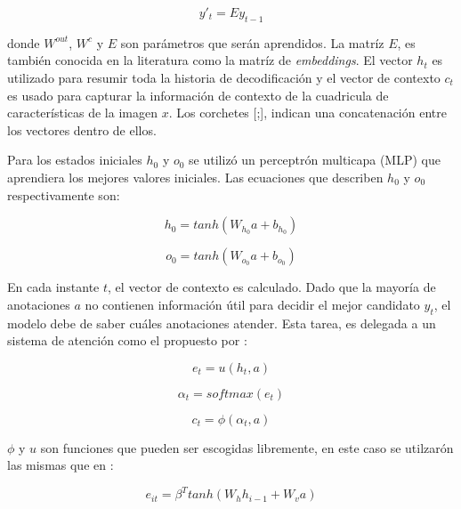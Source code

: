 \begin{equation}
    y'_{t} = E y_{t-1}
\end{equation}

donde $W ^ {out}$, $W ^ {c}$ y $E$ son parámetros que serán aprendidos. La matríz $E$, es también conocida en la literatura como la matríz de \textit{embeddings}. El vector $h_{t}$ es utilizado para resumir toda la historia de decodificación y el vector de contexto $c_{t}$ es usado para capturar la información de contexto de la cuadricula de características de la imagen $x$. Los corchetes [;], indican una concatenación entre los vectores dentro de ellos.

Para los estados iniciales $h_{0}$ y $o_{0}$ se utilizó un perceptrón multicapa (MLP) que aprendiera los mejores valores iniciales. Las ecuaciones que describen $h_{0}$ y $o_{0}$ respectivamente son:

\begin{equation}
    h_{0} = tanh(W_{h_{0}}a + b_{h_{0}})
\end{equation}

\begin{equation}
    o_{0} = tanh(W_{o_{0}}a + b_{o_{0}})
\end{equation}

En cada instante $t$, el vector de contexto es calculado. Dado que la mayoría de anotaciones $a$ no contienen información útil para decidir el mejor candidato $y_{t}$, el modelo debe de saber cuáles anotaciones atender. Esta tarea, es delegada a un sistema de atención como el propuesto por \cite{bahdanau2014neural}:

\begin{equation}
    e_{t} = u(h_{t}, a)
\end{equation}

\begin{equation}
    \alpha_{t} = softmax(e_{t})
\end{equation}

\begin{equation}
    c_{t} = \phi(\alpha_{t}, a)
\end{equation}

$\phi$ y $u$ son funciones que pueden ser escogidas libremente, en este caso se utilzarón las mismas que en \cite{harvard}:

\begin{equation}
    e_{it} = \beta ^ {T} tanh(W_{h}h_{i-1} + W_{v}a)
    \label{eq:e-attention}
\end{equation}

